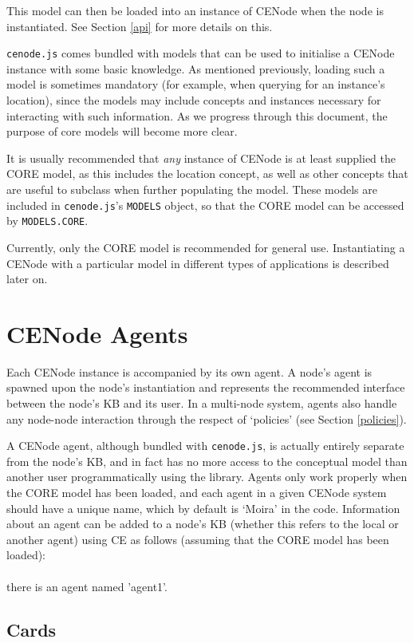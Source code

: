 \documentclass{scrartcl}
\newcommand{\ce}[1]{\textsf{#1}}
\newcommand{\js}[1]{\texttt{#1}}
\begin{document}
This model can then be loaded into an instance of CENode when the node is instantiated. See Section \ref{api} for more details on this.

\js{cenode.js} comes bundled with models that can be used to initialise a CENode instance with some basic knowledge. As mentioned previously, loading such a model is sometimes mandatory (for example, when querying for an instance's location), since the models may include concepts and instances necessary for interacting with such information. As we progress through this document, the purpose of core models will become more clear.

It is usually recommended that \textit{any} instance of CENode is at least supplied the CORE model, as this includes the \ce{location} concept, as well as other concepts that are useful to subclass when further populating the model. These models are included in \js{cenode.js}'s \js{MODELS} object, so that the CORE model can be accessed by \js{MODELS.CORE}. 

Currently, only the CORE model is recommended for general use. Instantiating a CENode with a particular model in different types of applications is described later on.



\section{CENode Agents}
Each CENode instance is accompanied by its own agent. A node's agent is spawned upon the node's instantiation and represents the recommended interface between the node's KB and its user. In a multi-node system, agents also handle any node-node interaction through the respect of `policies' (see Section \ref{policies}).

A CENode agent, although bundled with \js{cenode.js}, is actually entirely separate from the node's KB, and in fact has no more access to the conceptual model than another user programmatically using the library. Agents only work properly when the CORE model has been loaded, and each agent in a given CENode system should have a unique name, which by default is `Moira' in the code. Information about an agent can be added to a node's KB (whether this refers to the local or another agent) using CE as follows (assuming that the CORE model has been loaded):\\
\\\ce{there is an agent named 'agent1'.}

\subsection{Cards}
\end{document}

